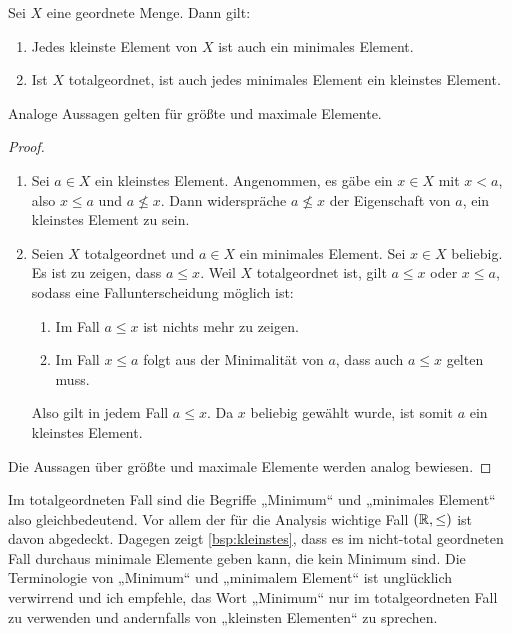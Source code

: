 \begin{satz} \label{kleinvsmin}
    Sei $X$ eine geordnete Menge. Dann gilt:
    \begin{enumerate}
        \item Jedes kleinste Element von $X$ ist auch ein minimales Element.
        \item Ist $X$ totalgeordnet, ist auch jedes minimales Element ein kleinstes Element.
    \end{enumerate}
    Analoge Aussagen gelten für größte und maximale Elemente.
\end{satz}
\begin{proof}
    \quad
    \begin{enumerate}
        \item Sei $a\in X$ ein kleinstes Element. Angenommen, es gäbe ein $x\in X$ mit $x<a$, also $x\le a$ und $a\not\le x$. Dann widerspräche $a\not\le x$ der Eigenschaft von $a$, ein kleinstes Element zu sein.
        \item Seien $X$ totalgeordnet und $a\in X$ ein minimales Element. Sei $x\in X$ beliebig. Es ist zu zeigen, dass $a\le x$. Weil $X$ totalgeordnet ist, gilt $a\le x$ oder $x\le a$, sodass eine Fallunterscheidung möglich ist:
        \begin{enumerate}[1)]
            \item Im Fall $a\le x$ ist nichts mehr zu zeigen.
            \item Im Fall $x\le a$ folgt aus der Minimalität von $a$, dass auch $a\le x$ gelten muss.
        \end{enumerate}
        Also gilt in jedem Fall $a\le x$. Da $x$ beliebig gewählt wurde, ist somit $a$ ein kleinstes Element.
    \end{enumerate}
    Die Aussagen über größte und maximale Elemente werden analog bewiesen.
\end{proof}


\begin{bem}
    Im totalgeordneten Fall sind die Begriffe „Minimum“ und „minimales Element“ also gleichbedeutend. Vor allem der für die Analysis wichtige Fall $(\mathbb R,\le)$ ist davon abgedeckt. Dagegen zeigt \cref{bsp:kleinstes}, dass es im nicht-total geordneten Fall durchaus minimale Elemente geben kann, die kein Minimum sind. Die Terminologie von „Minimum“ und „minimalem Element“ ist unglücklich verwirrend und ich empfehle, das Wort „Minimum“ nur im totalgeordneten Fall zu verwenden und andernfalls von „kleinsten Elementen“ zu sprechen.
\end{bem}


